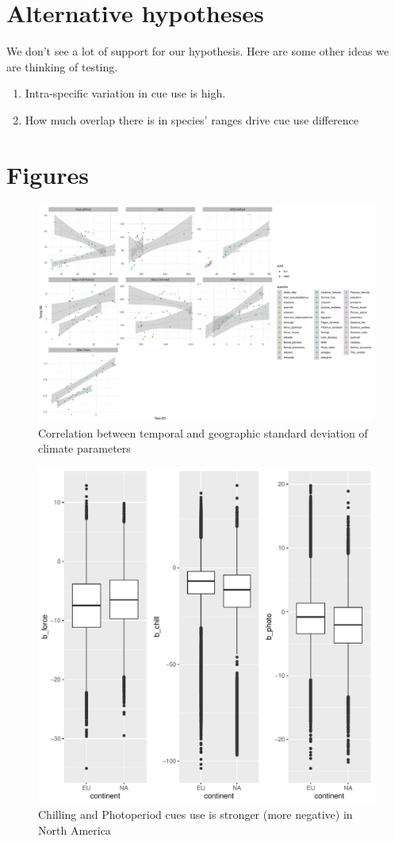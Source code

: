 \documentclass[11pt]{article}
\begin{document}
\section*{Alternative hypotheses}
We don't see a lot of support for our hypothesis. Here are  some other ideas we are thinking of testing.
\begin{enumerate}
\item Intra-specific variation in cue use is high.
\item How much overlap there is in species' ranges drive cue use difference
\end{enumerate}
\pagebreak[4]

\section*{Figures}
\begin{figure}[h!]
    \centering
         \includegraphics[width=.9\textwidth]{..//figures/spatial_vs_temporal/spatialtemporal_sds.pdf}
    \caption{Correlation between temporal and geographic standard deviation of climate parameters} 
    \label{fig:tempgeo}
\end{figure}

\begin{figure}[h!]
    \centering
         \includegraphics[width=.7\textwidth]{..//figures/continental_cues.pdf}
    \caption{ Chilling and Photoperiod cues use is stronger (more negative) in North America} 
    \label{fig:continent}
\end{figure}
\end{document}
